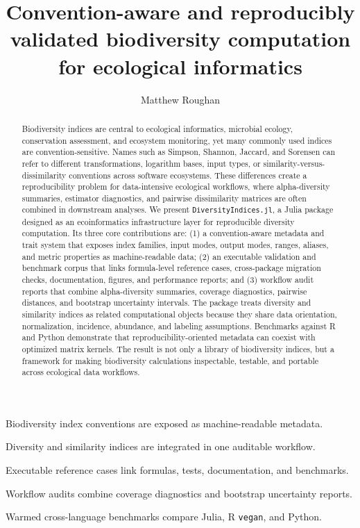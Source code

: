 \documentclass[preprint,12pt,authoryear]{elsarticle}
\begin{document}
\begin{frontmatter}

\title{Convention-aware and reproducibly validated biodiversity computation for ecological informatics}

\author[inst1]{Matthew Roughan}

\begin{abstract}
Biodiversity indices are central to ecological informatics, microbial ecology,
conservation assessment, and ecosystem monitoring, yet many commonly used
indices are convention-sensitive.  Names such as Simpson, Shannon, Jaccard,
and Sorensen can refer to different transformations, logarithm bases, input
types, or similarity-versus-dissimilarity conventions across software
ecosystems.  These differences create a reproducibility problem for
data-intensive ecological workflows, where alpha-diversity summaries,
estimator diagnostics, and pairwise dissimilarity matrices are often combined
in downstream analyses.  We present \texttt{DiversityIndices.jl}, a Julia
package designed as an ecoinformatics infrastructure layer for reproducible
diversity computation.  Its three core contributions are: (1) a
convention-aware metadata and trait system that exposes index families, input
modes, output modes, ranges, aliases, and metric properties as machine-readable
data; (2) an executable validation and benchmark corpus that links
formula-level reference cases, cross-package migration checks, documentation,
figures, and performance reports; and (3) workflow audit reports that combine
alpha-diversity summaries, coverage diagnostics, pairwise distances, and
bootstrap uncertainty intervals.  The package treats diversity and
similarity indices as related computational objects because they share data
orientation, normalization, incidence, abundance, and labeling assumptions.
Benchmarks against R and Python demonstrate that reproducibility-oriented
metadata can coexist with optimized matrix kernels.  The result is not only a
library of biodiversity indices, but a framework for making biodiversity
calculations inspectable, testable, and portable across ecological data
workflows.
\end{abstract}

\begin{highlights}
\item Biodiversity index conventions are exposed as machine-readable metadata.
\item Diversity and similarity indices are integrated in one auditable workflow.
\item Executable reference cases link formulas, tests, documentation, and benchmarks.
\item Workflow audits combine coverage diagnostics and bootstrap uncertainty reports.
\item Warmed cross-language benchmarks compare Julia, R \texttt{vegan}, and Python.
\end{highlights}


\end{frontmatter}
\end{document}
